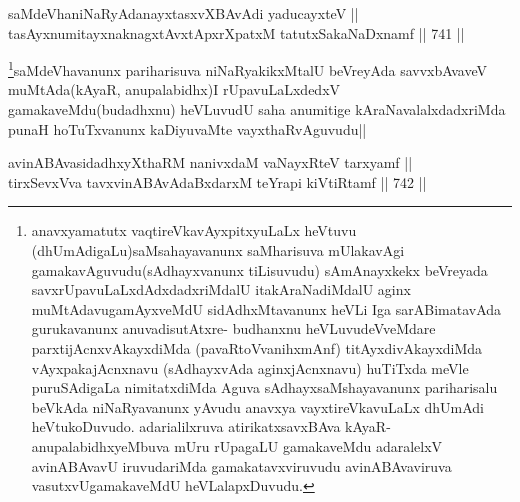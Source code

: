 \begin{shl}
saMdeVhaniNaRyAdanayxtasxvXBAvAdi yaducayxteV || \\
tasAyxnumitayxnaknagxtAvxtApxrXpatxM tatutxSakaNaDxnamf ||  741 ||  
\end{shl}

\begin{artha}
\footnote{anavxyamatutx vaqtireVkavAyxpitxyuLaLx heVtuvu (dhUmAdigaLu)saMsahayavanunx saMharisuva mUlakavAgi gamakavAguvudu(sAdhayxvanunx tiLisuvudu) sAmAnayxkekx beVreyada savxrUpavuLaLxdAdxdadxriMdalU itakAraNadiMdalU aginx muMtAdavugamAyxveMdU sidAdhxMtavanunx heVLi Iga sarABimatavAda gurukavanunx anuvadisutAtxre- budhanxnu heVLuvudeVveMdare parxtijAcnxvAkayxdiMda (pavaRtoVvanihxmAnf) titAyxdivAkayxdiMda vAyxpakajAcnxnavu (sAdhayxvAda aginxjAcnxnavu) huTiTxda meVle puruSAdigaLa nimitatxdiMda Aguva sAdhayxsaMshayavanunx pariharisalu beVkAda niNaRyavanunx yAvudu anavxya vayxtireVkavuLaLx dhUmAdi heVtukoDuvudo. adarialilxruva atirikatxsavxBAva kAyaR- anupalabidhxyeMbuva mUru rUpagaLU gamakaveMdu adaralelxV avinABAvavU iruvudariMda gamakatavxviruvudu avinABAvaviruva vasutxvUgamakaveMdU heVLalapxDuvudu.}saMdeVhavanunx pariharisuva niNaRyakikxMtalU beVreyAda savvxbAvaveV  muMtAda(kAyaR, anupalabidhx)I rUpavuLaLxdedxV gamakaveMdu(budadhxnu) heVLuvudU saha anumitige kAraNavalalxdadxriMda punaH hoTuTxvanunx kaDiyuvaMte vayxthaRvAguvudu||
\end{artha}


\begin{shl}
avinABAvasidadhxyXthaRM nanivxdaM vaNayxRteV tarxyamf || \\
tirxSevxVva tavxvinABAvAdaBxdarxM teYrapi kiVtiRtamf ||  742 ||  
\end{shl}

